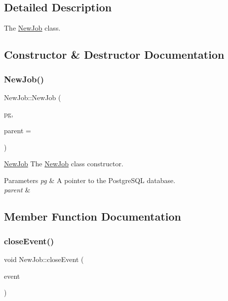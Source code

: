 \subsection{Detailed Description}
The \hyperlink{class_new_job}{New\+Job} class. 

\subsection{Constructor \& Destructor Documentation}
\mbox{\label{class_new_job_a8a989ea2877d88189001ab4d9acf70cb}} 
\subsubsection{\texorpdfstring{New\+Job()}{NewJob()}}
{\footnotesize\ttfamily New\+Job\+::\+New\+Job (\begin{DoxyParamCaption}\item[{\hyperlink{classpsql}{psql} $\ast$}]{pg,  }\item[{Q\+Widget $\ast$}]{parent = {} }\end{DoxyParamCaption})\hspace{0.3cm}{\ttfamily [explicit]}}



\hyperlink{class_new_job}{New\+Job} The \hyperlink{class_new_job}{New\+Job} class constructor. 


\begin{DoxyParams}{Parameters}
{\em pg} & A pointer to the Postgre\+S\+QL database. \\
\hline
{\em parent} & \\
\hline
\end{DoxyParams}


\subsection{Member Function Documentation}
\mbox{\label{class_new_job_a84f6390f63ce01fb860b375f53f9c68d}} 
\subsubsection{\texorpdfstring{close\+Event()}{closeEvent()}}
{\footnotesize\ttfamily void New\+Job\+::close\+Event (\begin{DoxyParamCaption}\item[{Q\+Close\+Event $\ast$}]{event }\end{DoxyParamCaption})\hspace{0.3cm}{\ttfamily [override]}}



